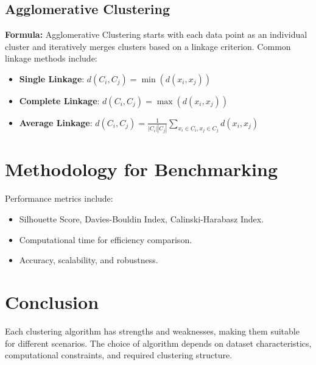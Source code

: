 \documentclass{article}
\begin{document}
\subsection{Agglomerative Clustering}
\textbf{Formula:} Agglomerative Clustering starts with each data point as an individual cluster and iteratively merges clusters based 
on a linkage criterion. Common linkage methods include:
\begin{itemize}
    \item \textbf{Single Linkage}: \( d(C_i, C_j) = \min(d(x_i, x_j)) \)
    \item \textbf{Complete Linkage}: \( d(C_i, C_j) = \max(d(x_i, x_j)) \)
    \item \textbf{Average Linkage}: \( d(C_i, C_j) = \frac{1}{|C_i| |C_j|} \sum_{x_i \in C_i, x_j \in C_j} d(x_i, x_j) \)
\end{itemize}

\section{Methodology for Benchmarking}
Performance metrics include:
\begin{itemize}
    \item Silhouette Score, Davies-Bouldin Index, Calinski-Harabasz Index.
    \item Computational time for efficiency comparison.
    \item Accuracy, scalability, and robustness.
\end{itemize}

\section{Conclusion}
Each clustering algorithm has strengths and weaknesses, making them suitable for different scenarios. The choice of 
algorithm depends on dataset characteristics, computational constraints, and required clustering structure.
\end{document}
